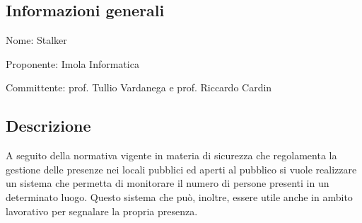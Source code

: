 \documentclass[../studio-di-fattibilita.tex]{subfiles}
\begin{document}
\subsection{Informazioni generali}%
\label{sub:informazioni_generale}
\begin{description}
  \item Nome: Stalker
  \item Proponente: Imola Informatica
  \item Committente: prof. Tullio Vardanega e prof. Riccardo Cardin
\end{description}

\subsection{Descrizione}%
\label{sub:descrizione}
A seguito della normativa vigente in materia di sicurezza che regolamenta la gestione delle presenze nei locali pubblici ed aperti al pubblico si vuole realizzare un sistema che permetta di monitorare il numero di persone presenti in un determinato luogo. Questo sistema che può, inoltre, essere utile anche in ambito lavorativo per segnalare la propria presenza.
\end{document}
